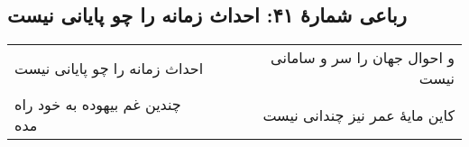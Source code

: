 \begin{center}
\section*{رباعی شمارهٔ ۴۱: احداث زمانه را چو پایانی نیست}
\label{sec:041}
\begin{longtable}{l p{0.5cm} r}
احداث زمانه را چو پایانی نیست
&&
و احوال جهان را سر و سامانی نیست
\\
چندین غم بیهوده به خود راه مده
&&
کاین  مایهٔ عمر نیز چندانی نیست
\\
\end{longtable}
\end{center}
